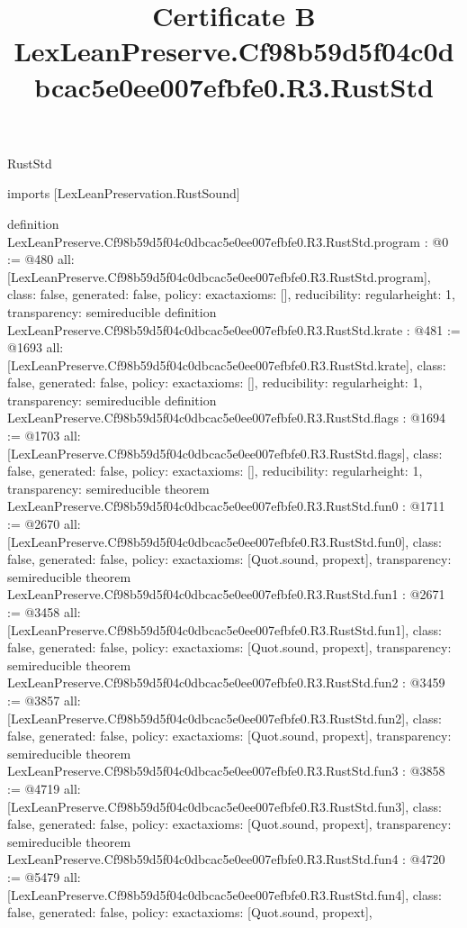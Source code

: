 \begin{lexlean}{RustStd}
\title{Certificate B LexLeanPreserve.Cf98b59d5f04c0dbcac5e0ee007efbfe0.R3.RustStd}
\begin{coremodule}
imports [LexLeanPreservation.RustSound]

definition LexLeanPreserve.Cf98b59d5f04c0dbcac5e0ee007efbfe0.R3.RustStd.program : @0 := @480 {
  all: [LexLeanPreserve.Cf98b59d5f04c0dbcac5e0ee007efbfe0.R3.RustStd.program],
  class: false,
  generated: false,
  policy: exact{axioms: []},
  reducibility: regular{height: 1},
  transparency: semireducible
}
definition LexLeanPreserve.Cf98b59d5f04c0dbcac5e0ee007efbfe0.R3.RustStd.krate : @481 := @1693 {
  all: [LexLeanPreserve.Cf98b59d5f04c0dbcac5e0ee007efbfe0.R3.RustStd.krate],
  class: false,
  generated: false,
  policy: exact{axioms: []},
  reducibility: regular{height: 1},
  transparency: semireducible
}
definition LexLeanPreserve.Cf98b59d5f04c0dbcac5e0ee007efbfe0.R3.RustStd.flags : @1694 := @1703 {
  all: [LexLeanPreserve.Cf98b59d5f04c0dbcac5e0ee007efbfe0.R3.RustStd.flags],
  class: false,
  generated: false,
  policy: exact{axioms: []},
  reducibility: regular{height: 1},
  transparency: semireducible
}
theorem LexLeanPreserve.Cf98b59d5f04c0dbcac5e0ee007efbfe0.R3.RustStd.fun0 : @1711 := @2670 {
  all: [LexLeanPreserve.Cf98b59d5f04c0dbcac5e0ee007efbfe0.R3.RustStd.fun0],
  class: false,
  generated: false,
  policy: exact{axioms: [Quot.sound, propext]},
  transparency: semireducible
}
theorem LexLeanPreserve.Cf98b59d5f04c0dbcac5e0ee007efbfe0.R3.RustStd.fun1 : @2671 := @3458 {
  all: [LexLeanPreserve.Cf98b59d5f04c0dbcac5e0ee007efbfe0.R3.RustStd.fun1],
  class: false,
  generated: false,
  policy: exact{axioms: [Quot.sound, propext]},
  transparency: semireducible
}
theorem LexLeanPreserve.Cf98b59d5f04c0dbcac5e0ee007efbfe0.R3.RustStd.fun2 : @3459 := @3857 {
  all: [LexLeanPreserve.Cf98b59d5f04c0dbcac5e0ee007efbfe0.R3.RustStd.fun2],
  class: false,
  generated: false,
  policy: exact{axioms: [Quot.sound, propext]},
  transparency: semireducible
}
theorem LexLeanPreserve.Cf98b59d5f04c0dbcac5e0ee007efbfe0.R3.RustStd.fun3 : @3858 := @4719 {
  all: [LexLeanPreserve.Cf98b59d5f04c0dbcac5e0ee007efbfe0.R3.RustStd.fun3],
  class: false,
  generated: false,
  policy: exact{axioms: [Quot.sound, propext]},
  transparency: semireducible
}
theorem LexLeanPreserve.Cf98b59d5f04c0dbcac5e0ee007efbfe0.R3.RustStd.fun4 : @4720 := @5479 {
  all: [LexLeanPreserve.Cf98b59d5f04c0dbcac5e0ee007efbfe0.R3.RustStd.fun4],
  class: false,
  generated: false,
  policy: exact{axioms: [Quot.sound, propext]},
}
\end{coremodule}
\end{lexlean}
